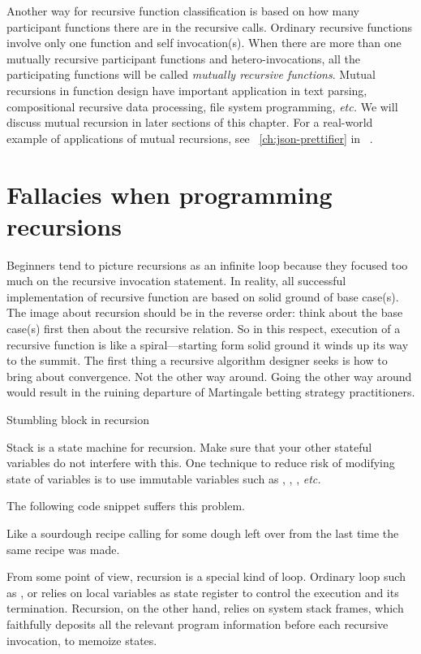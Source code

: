 Another way for recursive function classification is based on how many participant functions
there are in the recursive calls.
Ordinary recursive functions involve only one function and self invocation(s).
When there are more than one mutually recursive participant functions and hetero-invocations, all
the participating functions will be called \emph{mutually recursive functions}.
Mutual recursions in function design have important application in text parsing, compositional
recursive data processing, file system programming, \textit{etc.}
We will discuss mutual recursion in later sections of this chapter.
For a real-world example of applications of mutual recursions, see ~\autoref{ch:json-prettifier} in
~.

\section{Fallacies when programming recursions}\label{sec:recursiveFallacies}

Beginners tend to picture recursions as an infinite loop because they focused too much on the
recursive invocation statement.
In reality, all successful implementation of recursive function are based on solid ground of base
case(s).
The image about recursion should be in the reverse order: think about the base case(s) first then
about the recursive relation.
So in this respect, execution of a recursive function is like a spiral---starting form solid
ground it winds up its way to the summit.
The first thing a recursive algorithm designer seeks is how to bring about convergence.
Not the other way around.
Going the other way around would result in the ruining departure of Martingale betting strategy
practitioners.

Stumbling block in recursion

Stack is a state machine for recursion.
Make sure that your other stateful variables do not interfere with this.
One technique to reduce risk of modifying state of variables is to use immutable variables such
as , , , \textit{etc.}

The following code snippet suffers this problem.


Like a sourdough recipe calling for some dough left over from the last time the same recipe was
made.

From some point of view, recursion is a special kind of loop.
Ordinary loop such as ,  or  relies on local variables as
state register to control the execution and its termination.
Recursion, on the other hand, relies on system stack frames, which faithfully
deposits all the relevant program information before each recursive invocation,
to memoize states.


